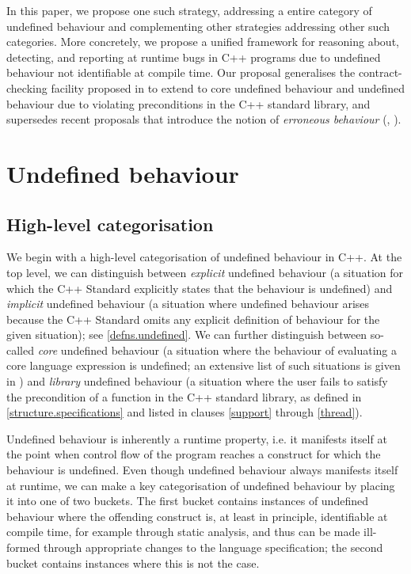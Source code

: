 In this paper, we propose one such strategy, addressing a entire category of undefined behaviour and complementing other strategies addressing other such categories. More concretely, we propose a unified framework for reasoning about, detecting, and reporting at runtime bugs in C++ programs due to undefined behaviour not identifiable at compile time. Our proposal generalises the contract-checking facility proposed in \cite{P2900R4} to extend to core undefined behaviour and undefined behaviour due to violating  preconditions in the C++ standard library, and supersedes recent proposals that introduce the notion of \emph{erroneous behaviour} (\cite{P2795R4}, \cite{P2973R0}).

\section{Undefined behaviour}

\subsection{High-level categorisation}

We begin with a high-level categorisation of undefined behaviour in C++. At the top level, we can distinguish between \emph{explicit} undefined behaviour (a situation for which the C++ Standard explicitly states that the behaviour is undefined) and \emph{implicit} undefined behaviour (a situation where undefined behaviour arises because the C++ Standard omits any explicit definition of behaviour for the given situation); see \href{https://eel.is/c++draft/defns.undefined}{[defns.undefined]}. We can further distinguish between so-called \emph{core} undefined behaviour (a situation where the behaviour of evaluating a core language expression is undefined; an extensive list of such situations is given in \cite{P1705R1}) and \emph{library} undefined behaviour (a situation where the user fails to satisfy the precondition of a function in the C++ standard library, as defined in \href{https://eel.is/c++draft/structure.specifications}{[structure.specifications]} and listed in clauses \href{https://eel.is/c++draft/support}{[support]} through \href{https://eel.is/c++draft/thread}{[thread]}).

Undefined behaviour is inherently a runtime property, i.e. it manifests itself at the point when control flow of the program reaches a construct for which the behaviour is undefined. Even though undefined behaviour always manifests itself at runtime, we can make a key categorisation of undefined behaviour by placing it into one of two buckets. The first bucket contains instances of undefined behaviour where the offending construct is, at least in principle, identifiable at compile time, for example through static analysis, and thus can be made ill-formed through appropriate changes to the language specification; the second bucket contains instances where this is not the case.

